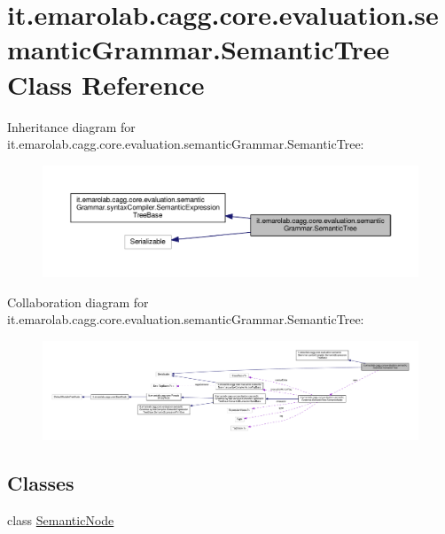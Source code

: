 \hypertarget{classit_1_1emarolab_1_1cagg_1_1core_1_1evaluation_1_1semanticGrammar_1_1SemanticTree}{\section{it.\-emarolab.\-cagg.\-core.\-evaluation.\-semantic\-Grammar.\-Semantic\-Tree Class Reference}
\label{classit_1_1emarolab_1_1cagg_1_1core_1_1evaluation_1_1semanticGrammar_1_1SemanticTree}
}


Inheritance diagram for it.\-emarolab.\-cagg.\-core.\-evaluation.\-semantic\-Grammar.\-Semantic\-Tree\-:\nopagebreak
\begin{figure}[H]
\begin{center}
\leavevmode
\includegraphics[width=350pt]{classit_1_1emarolab_1_1cagg_1_1core_1_1evaluation_1_1semanticGrammar_1_1SemanticTree__inherit__graph}
\end{center}
\end{figure}


Collaboration diagram for it.\-emarolab.\-cagg.\-core.\-evaluation.\-semantic\-Grammar.\-Semantic\-Tree\-:\nopagebreak
\begin{figure}[H]
\begin{center}
\leavevmode
\includegraphics[width=350pt]{classit_1_1emarolab_1_1cagg_1_1core_1_1evaluation_1_1semanticGrammar_1_1SemanticTree__coll__graph}
\end{center}
\end{figure}
\subsection*{Classes}
\begin{DoxyCompactItemize}
\item 
class \hyperlink{classit_1_1emarolab_1_1cagg_1_1core_1_1evaluation_1_1semanticGrammar_1_1SemanticTree_1_1SemanticNode}{Semantic\-Node}
\end{DoxyCompactItemize}
